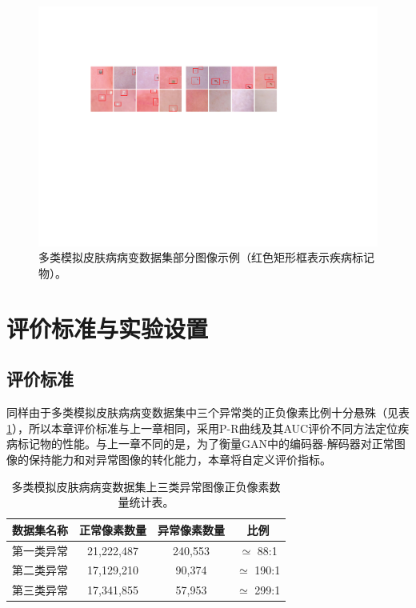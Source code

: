 \begin{figure}[h]
	\centering
	\includegraphics[width=1.0\textwidth]{figure/multi_classes_simulated_skin.pdf}
	\caption[多类模拟皮肤病病变数据集部分图像示例]{多类模拟皮肤病病变数据集部分图像示例（红色矩形框表示疾病标记物）。}
	\label{fig:mul_classes_simulated_ds}
\end{figure}
\vspace{-0.7cm}
\section{评价标准与实验设置}
\subsection{评价标准}
同样由于多类模拟皮肤病病变数据集中三个异常类的正负像素比例十分悬殊（见表\ref{tab:multi_ds_pixel_freqs}），所以本章评价标准与上一章相同，采用P-R曲线及其AUC评价不同方法定位疾病标记物的性能。与上一章不同的是，为了衡量GAN中的编码器-解码器对正常图像的保持能力和对异常图像的转化能力，本章将自定义评价指标。
\begin{table}[h]
	\centering
	\caption[多类模拟皮肤病病变数据集上三类异常图像正负像素数量统计表]{多类模拟皮肤病病变数据集上三类异常图像正负像素数量统计表。}
	\label{tab:multi_ds_pixel_freqs}
	\begin{tabular}{c|c|c|c}
		\toprule[2pt]
		数据集名称 & 正常像素数量 & 异常像素数量 & 比例 \\
		\midrule[2pt]
		第一类异常&  21,222,487 & 240,553 & $\simeq$ 88:1 \\ \hline
		第二类异常&  17,129,210 & 90,374 & $\simeq$ 190:1 \\ \hline
		第三类异常 & 17,341,855 & 57,953 & $\simeq$ 299:1 \\
		\bottomrule[2pt]
	\end{tabular}
\end{table}
\vspace{-0.7cm}
